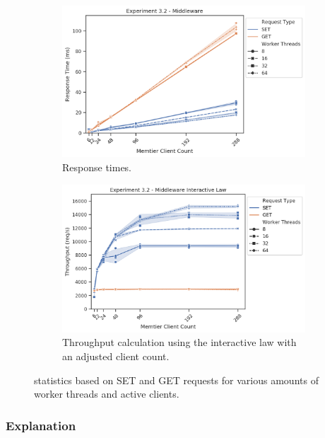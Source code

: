\begin{figure}
{\begin{subfigure}[t!]{0.55\textwidth}
                    \includegraphics[width=1\textwidth]{../data_analysis/figures/3-2_mw_response_time.png}
                    \caption{Response times.\label{fig:double_mw_rt}}
                \end{subfigure}
                \begin{subfigure}[t!]{0.55\textwidth}
                    \centering
                    \includegraphics[width=1\textwidth]{../data_analysis/figures/3-2_mw_throughput-il.png}
                    \caption{Throughput calculation using the interactive law with an adjusted client
                             count.\label{fig:double_mw_tp-il}}
                \end{subfigure}
            }
            \caption{\mw{} statistics based on SET and GET requests for various amounts of worker threads and active
                     clients.\label{fig:double_mw_all}}
        \end{figure}

        \subsubsection{Explanation\label{subsubsec:3_two-middlewares_summary}}


